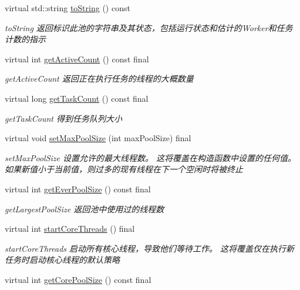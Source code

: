 \begin{DoxyCompactItemize}
virtual std\+::string \hyperlink{classThreadPoolExecutor_a8e340cec3bb976f7773db103d73189c2}{to\+String} () const
\begin{DoxyCompactList}\small\item\em to\+String 返回标识此池的字符串及其状态，包括运行状态和估计的\+Worker和任务计数的指示 \end{DoxyCompactList}\item 
virtual int \hyperlink{classThreadPoolExecutor_ac9345329aa167200bec31951d2f5a690}{get\+Active\+Count} () const final
\begin{DoxyCompactList}\small\item\em get\+Active\+Count 返回正在执行任务的线程的大概数量 \end{DoxyCompactList}\item 
virtual long \hyperlink{classThreadPoolExecutor_a396d50079b39787928ead5f122781de6}{get\+Task\+Count} () const final
\begin{DoxyCompactList}\small\item\em get\+Task\+Count 得到任务队列大小 \end{DoxyCompactList}\item 
virtual void \hyperlink{classThreadPoolExecutor_ac5a10d336958ca43530b31bff81c9c4b}{set\+Max\+Pool\+Size} (int max\+Pool\+Size) final
\begin{DoxyCompactList}\small\item\em set\+Max\+Pool\+Size 设置允许的最大线程数。 这将覆盖在构造函数中设置的任何值。 如果新值小于当前值，则过多的现有线程在下一个空闲时将被终止 \end{DoxyCompactList}\item 
virtual int \hyperlink{classThreadPoolExecutor_af630e5117b4f67428a4fcbee5c15a7d9}{get\+Ever\+Pool\+Size} () const final
\begin{DoxyCompactList}\small\item\em get\+Largest\+Pool\+Size 返回池中使用过的线程数 \end{DoxyCompactList}\item 
virtual int \hyperlink{classThreadPoolExecutor_a1ee7a201ac0a8c9bd246a83939e39194}{start\+Core\+Threads} () final
\begin{DoxyCompactList}\small\item\em start\+Core\+Threads 启动所有核心线程，导致他们等待工作。 这将覆盖仅在执行新任务时启动核心线程的默认策略 \end{DoxyCompactList}\item 
virtual int \hyperlink{classThreadPoolExecutor_af29377a50af53031bb06aeacf9ef27f7}{get\+Core\+Pool\+Size} () const final

\end{DoxyCompactItemize}
